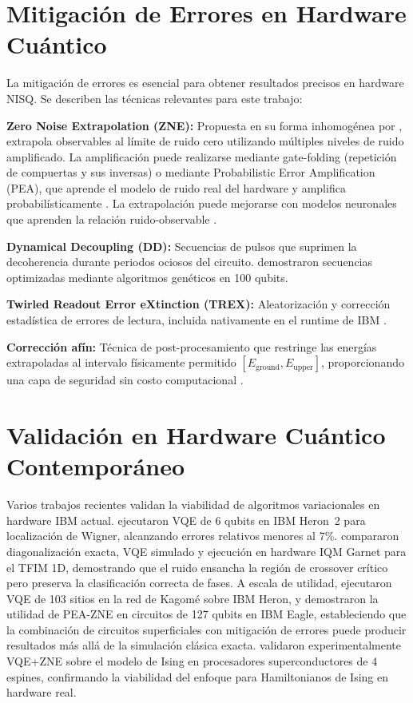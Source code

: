 \documentclass[11pt,a4paper,spanish]{book}
\begin{document}
\section{Mitigación de Errores en Hardware Cuántico}

La mitigación de errores es esencial para obtener resultados precisos en hardware NISQ. Se describen las técnicas relevantes para este trabajo:

\textbf{Zero Noise Extrapolation (ZNE):} Propuesta en su forma inhomogénea por \citet{uvarov2024}, extrapola observables al límite de ruido cero utilizando múltiples niveles de ruido amplificado. La amplificación puede realizarse mediante gate-folding (repetición de compuertas y sus inversas) o mediante Probabilistic Error Amplification (PEA), que aprende el modelo de ruido real del hardware y amplifica probabilísticamente \citep{kim2023}. La extrapolación puede mejorarse con modelos neuronales que aprenden la relación ruido-observable \citep{sun2025}.

\textbf{Dynamical Decoupling (DD):} Secuencias de pulsos que suprimen la decoherencia durante periodos ociosos del circuito. \citet{pokharel2025} demostraron secuencias optimizadas mediante algoritmos genéticos en 100 qubits.

\textbf{Twirled Readout Error eXtinction (TREX):} Aleatorización y corrección estadística de errores de lectura, incluida nativamente en el runtime de IBM \citep{vandenberg2022}.

\textbf{Corrección afín:} Técnica de post-procesamiento que restringe las energías extrapoladas al intervalo físicamente permitido $[E_{\text{ground}}, E_{\text{upper}}]$, proporcionando una capa de seguridad sin costo computacional \citep{wang2024}.

\section{Validación en Hardware Cuántico Contemporáneo}

Varios trabajos recientes validan la viabilidad de algoritmos variacionales en hardware IBM actual. \citet{kiiamov2026} ejecutaron VQE de 6 qubits en IBM Heron~2 para localización de Wigner, alcanzando errores relativos menores al 7\%. \citet{sharma2026} compararon diagonalización exacta, VQE simulado y ejecución en hardware IQM Garnet para el TFIM 1D, demostrando que el ruido ensancha la región de crossover crítico pero preserva la clasificación correcta de fases. A escala de utilidad, \citet{ahsan2025} ejecutaron VQE de 103 sitios en la red de Kagomé sobre IBM Heron, y \citet{kim2023} demostraron la utilidad de PEA-ZNE en circuitos de 127 qubits en IBM Eagle, estableciendo que la combinación de circuitos superficiales con mitigación de errores puede producir resultados más allá de la simulación clásica exacta. \citet{ma2025} validaron experimentalmente VQE+ZNE sobre el modelo de Ising en procesadores superconductores de 4 espines, confirmando la viabilidad del enfoque para Hamiltonianos de Ising en hardware real.
\end{document}
